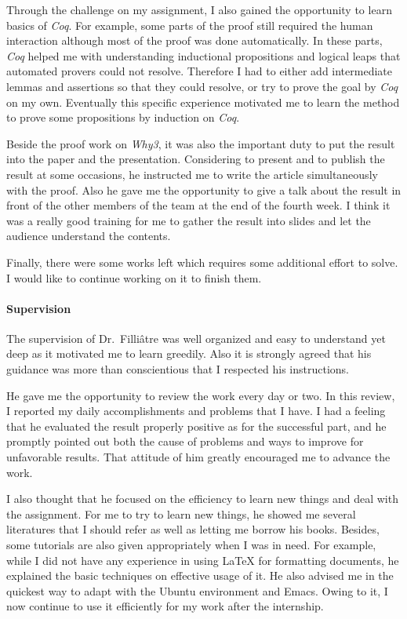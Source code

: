 \documentclass[a4paper,10.5pt]{article}
\begin{document}
Through the challenge on my assignment, I also gained the opportunity
to learn basics of \emph{Coq}. For example, some parts of the proof
still required the human interaction although most of the proof was
done automatically. In these parts, \emph{Coq} helped me with
understanding inductional propositions and logical leaps that
automated provers could not resolve. Therefore I had to either add
intermediate lemmas and assertions so that they could resolve, or try
to prove the goal by \emph{Coq} on my own. Eventually this specific
experience motivated me to learn the method to prove some propositions
by induction on \emph{Coq}.

Beside the proof work on \emph{Why3}, it was also the important duty
to put the result into the paper and the presentation. Considering to
present and to publish the result at some occasions, he instructed me
to write the article simultaneously with the proof. Also he gave me
the opportunity to give a talk about the result in front of the other
members of the team at the end of the fourth week. I think it was a
really good training for me to gather the result into slides and let
the audience understand the contents.

Finally, there were some works left which requires some additional
effort to solve. I would like to continue working on it to finish
them.

\paragraph{Supervision}

The supervision of Dr.\ Filli\^atre was well organized and easy to
understand yet deep as it motivated me to learn greedily. Also it is
strongly agreed that his guidance was more than conscientious that I
respected his instructions.

He gave me the opportunity to review the work every day or two. In
this review, I reported my daily accomplishments and problems that I
have. I had a feeling that he evaluated the result properly positive
as for the successful part, and he promptly pointed out both the cause
of problems and ways to improve for unfavorable results. That attitude
of him greatly encouraged me to advance the work.

I also thought that he focused on the efficiency to learn new things
and deal with the assignment. For me to try to learn new things, he
showed me several literatures that I should refer as well as letting
me borrow his books. Besides, some tutorials are also given
appropriately when I was in need. For example, while I did not have
any experience in using LaTeX for formatting documents, he explained
the basic techniques on effective usage of it. He also advised me in
the quickest way to adapt with the Ubuntu environment and Emacs. Owing
to it, I now continue to use it efficiently for my work after the
internship.
\end{document}
